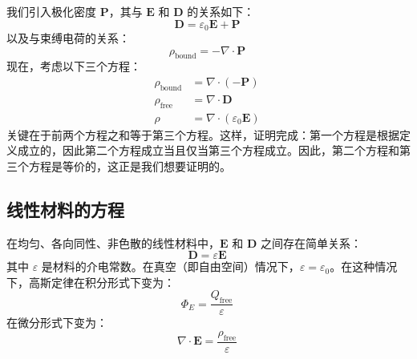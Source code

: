 我们引入极化密度 \( \mathbf{P} \)，其与 \( \mathbf{E} \) 和 \( \mathbf{D} \) 的关系如下：
\[
\mathbf{D} = \varepsilon_0 \mathbf{E} + \mathbf{P}~
\]
以及与束缚电荷的关系：
\[
\rho_{\mathrm{bound}} = -\nabla \cdot \mathbf{P}~
\]
现在，考虑以下三个方程：
\[
\begin{aligned}
\rho_{\mathrm{bound}} &= \nabla \cdot (-\mathbf{P}) \\
\rho_{\mathrm{free}} &= \nabla \cdot \mathbf{D} \\
\rho &= \nabla \cdot (\varepsilon_0 \mathbf{E})
\end{aligned}~
\]
关键在于前两个方程之和等于第三个方程。这样，证明完成：第一个方程是根据定义成立的，因此第二个方程成立当且仅当第三个方程成立。因此，第二个方程和第三个方程是等价的，这正是我们想要证明的。
\subsection{线性材料的方程}
在均匀、各向同性、非色散的线性材料中，\(\mathbf{E}\) 和 \(\mathbf{D}\) 之间存在简单关系：
\[
\mathbf{D} = \varepsilon \mathbf{E}~
\]
其中 \(\varepsilon\) 是材料的介电常数。在真空（即自由空间）情况下，\(\varepsilon = \varepsilon_0\)。在这种情况下，高斯定律在积分形式下变为：
\[
\Phi_{E} = \frac{Q_{\mathrm{free}}}{\varepsilon}~
\]
在微分形式下变为：
\[
\nabla \cdot \mathbf{E} = \frac{\rho_{\mathrm{free}}}{\varepsilon}~
\]